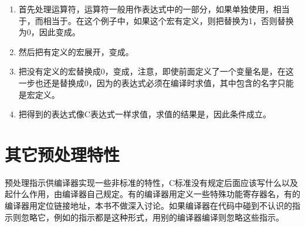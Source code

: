 \begin{enumerate}

\item 首先处理运算符，运算符一般用作表达式中的一部分，如果单独使用，相当于，而相当于。在这个例子中，如果这个宏有定义，则把替换为1，否则替换为0，因此变成。

\item 然后把有定义的宏展开，变成。

\item 把没有定义的宏替换成0，变成，注意，即使前面定义了一个变量名是，在这一步也还是替换成0，因为的表达式必须在编译时求值，其中包含的名字只能是宏定义。

\item 把得到的表达式像C表达式一样求值，求值的结果是，因此条件成立。
\end{enumerate}




\section{其它预处理特性}
%
预处理指示供编译器实现一些非标准的特性，C标准没有规定后面应该写什么以及起什么作用，由编译器自己规定。有的编译器用定义一些特殊功能寄存器名，有的编译器用定位链接地址，本书不做深入讨论。如果编译器在代码中碰到不认识的指示则忽略它，例如的指示都是这种形式，用别的编译器编译则忽略这些指示。



